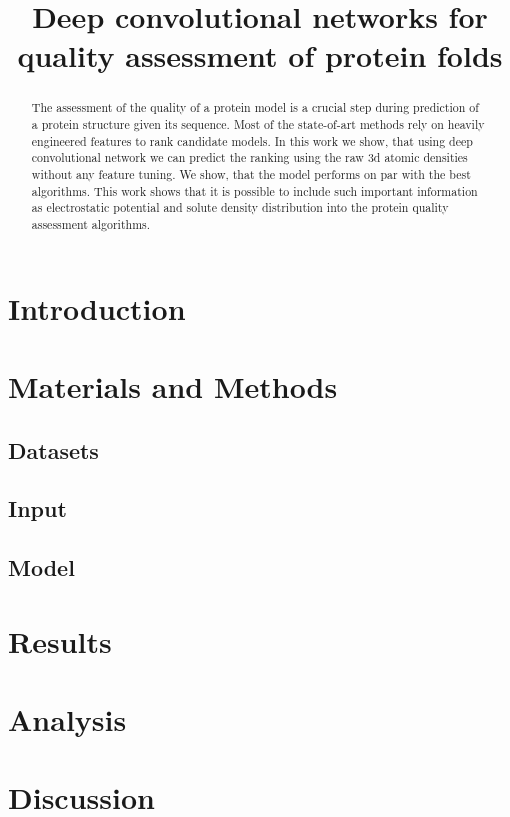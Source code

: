 \documentclass[letter,10pt]{article}
\title{Deep convolutional networks for quality assessment of protein folds}
\author{}
\begin{document}
\maketitle

\begin{abstract}
The assessment of the quality of a protein model is a crucial step during prediction of a protein structure given its sequence. 
Most of the state-of-art methods rely on heavily engineered features to rank candidate models. In this work we show, that 
using deep convolutional network we can predict the ranking using the raw 3d atomic densities without any feature tuning. 
We show, that the model performs on par with the best algorithms. This work shows that it is possible to include 
such important information as electrostatic potential and solute density distribution into the protein quality assessment algorithms.
\end{abstract}

\section{Introduction}


\section{Materials and Methods}

\subsection{Datasets}


\subsection{Input}


\subsection{Model}




\section{Results}


\section{Analysis}


\section{Discussion}




\end{document}
